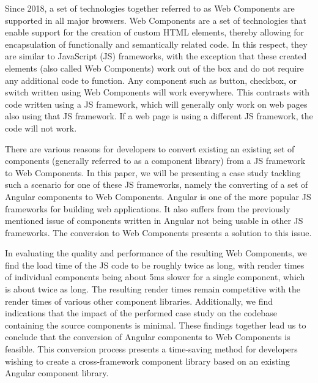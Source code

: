 Since 2018, a set of technologies together referred to as Web Components are supported in all major browsers. Web Components are a set of technologies that enable support for the creation of custom HTML elements, thereby allowing for encapsulation of functionally and semantically related code. In this respect, they are similar to JavaScript (JS) frameworks, with the exception that these created elements (also called Web Components) work out of the box and do not require any additional code to function. Any component such as button, checkbox, or switch written using Web Components will work everywhere. This contrasts with code written using a JS framework, which will generally only work on web pages also using that JS framework. If a web page is using a different JS framework, the code will not work. 

There are various reasons for developers to convert existing an existing set of components (generally referred to as a component library) from a JS framework to Web Components. In this paper, we will be presenting a case study tackling such a scenario for one of these JS frameworks, namely the converting of a set of Angular components to Web Components. Angular is one of the more popular JS frameworks for building web applications. It also suffers from the previously mentioned issue of components written in Angular not being usable in other JS frameworks. The conversion to Web Components presents a solution to this issue.

In evaluating the quality and performance of the resulting Web Components, we find the load time of the JS code to be roughly twice as long, with render times of individual components being about 5ms slower for a single component, which is about twice as long. The resulting render times remain competitive with the render times of various other component libraries. Additionally, we find indications that the impact of the performed case study on the codebase containing the source components is minimal. These findings together lead us to conclude that the conversion of Angular components to Web Components is feasible. This conversion process presents a time-saving method for developers wishing to create a cross-framework component library based on an existing Angular component library.